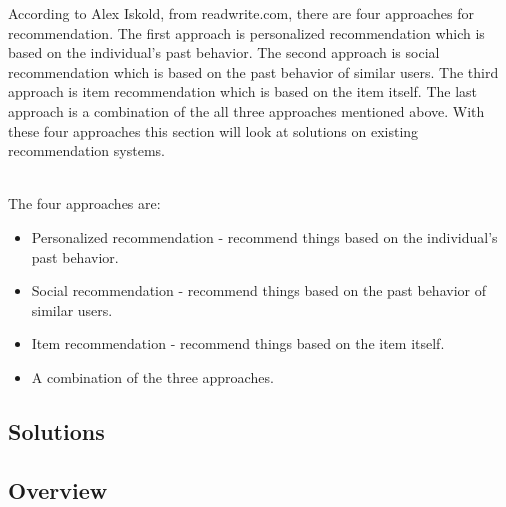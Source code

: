 According to Alex Iskold, from readwrite.com, there are four approaches for recommendation. The first approach is personalized recommendation which is based on the individual’s past behavior. The second approach is social recommendation which is based on the past behavior of similar users. The third approach is item recommendation which is based on the item itself. The last approach is a combination of the all three approaches mentioned above. With these four approaches this section will look at solutions on existing recommendation systems. \cite{ReadWrite}

\\
The four approaches are:

\begin{itemize}
	\item Personalized recommendation - recommend things based on the individual's past behavior. 
	\item Social recommendation - recommend things based on the past behavior  of similar users. 
	\item Item recommendation - recommend things based on the item itself.
	\item A combination of the three approaches.
\end{itemize}

\subsection{Solutions}
\label{Solutions}

\subsection{Overview}
\label{SolutionOverview}
